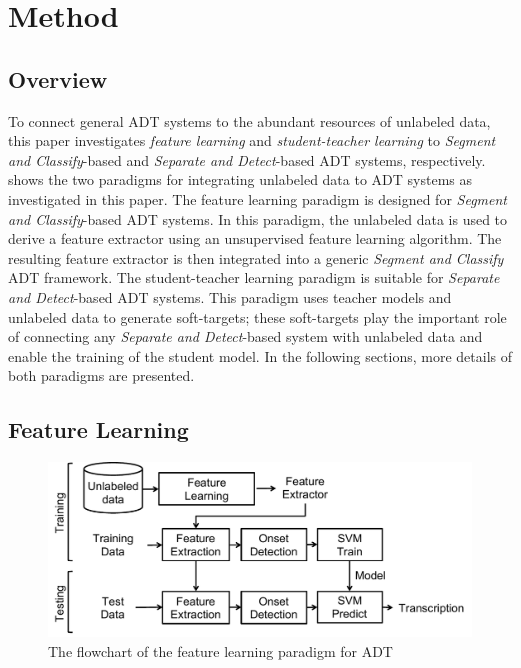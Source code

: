 \documentclass{article}
\begin{document}
%
\section{Method}
\label{sec:method}
\subsection{Overview}

To connect general ADT systems to the abundant resources of unlabeled data, this paper investigates \textit{feature learning} and \textit{student-teacher learning} to \textit{Segment and Classify}-based and \textit{Separate and Detect}-based ADT systems, respectively.  shows the two paradigms for integrating unlabeled data to ADT systems as investigated in this paper. The feature learning paradigm is designed for \textit{Segment and Classify}-based ADT systems. In this paradigm, the unlabeled data is used to derive a feature extractor using an unsupervised feature learning algorithm. The resulting feature extractor is then integrated into a generic \textit{Segment and Classify} ADT framework. The student-teacher learning paradigm is suitable for \textit{Separate and Detect}-based ADT systems. This paradigm uses teacher models and unlabeled data to generate soft-targets; these soft-targets play the important role of connecting any \textit{Separate and Detect}-based system with unlabeled data and enable the training of the student model. In the following sections, more details of both paradigms are presented. 

\subsection{Feature Learning}
\label{subsec:featureLearning}


\begin{figure}
\centering
\includegraphics[width = \columnwidth]{./figs/featurelearningSys.pdf}
\caption{The flowchart of the feature learning paradigm for ADT}
\label{fig:featureLearningFlow}
\end{figure}
\end{document}
